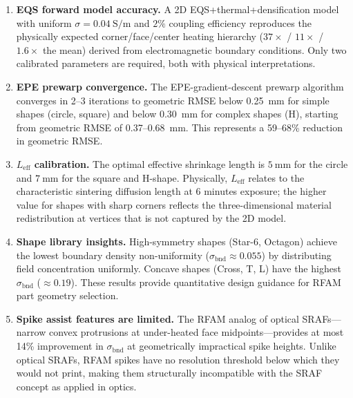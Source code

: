 \documentclass[10pt,twocolumn]{article}
\newcommand{\bndstd}{\sigma_{\mathrm{bnd}}}
\newcommand{\Leff}{L_{\mathrm{eff}}}
\begin{document}
\begin{enumerate}

\item \textbf{EQS forward model accuracy.}  A 2D EQS+thermal+densification
      model with uniform $\sigma = \SI{0.04}{\siemens\per\meter}$ and
      $2\%$ coupling efficiency reproduces the physically expected
      corner/face/center heating hierarchy ($37\times$ / $11\times$ /
      $1.6\times$ the mean) derived from electromagnetic boundary
      conditions.  Only two calibrated parameters are required, both
      with physical interpretations.

\item \textbf{EPE prewarp convergence.}  The EPE-gradient-descent
      prewarp algorithm converges in 2--3 iterations to geometric RMSE
      below \SI{0.25}{\milli\meter} for simple shapes (circle, square)
      and below \SI{0.30}{\milli\meter} for complex shapes (H), starting
      from geometric RMSE of 0.37--\SI{0.68}{\milli\meter}.  This
      represents a 59--68\% reduction in geometric RMSE.

\item \textbf{$\Leff$ calibration.}  The optimal effective shrinkage
      length is $\SI{5}{\milli\meter}$ for the circle and
      $\SI{7}{\milli\meter}$ for the square and H-shape.  Physically,
      $\Leff$ relates to the characteristic sintering diffusion length
      at 6 minutes exposure; the higher value for shapes with sharp
      corners reflects the three-dimensional material redistribution
      at vertices that is not captured by the 2D model.

\item \textbf{Shape library insights.}  High-symmetry shapes (Star-6,
      Octagon) achieve the lowest boundary density non-uniformity
      ($\bndstd \approx 0.055$) by distributing field concentration
      uniformly.  Concave shapes (Cross, T, L) have the highest
      $\bndstd$ ($\approx 0.19$).  These results provide quantitative
      design guidance for RFAM part geometry selection.

\item \textbf{Spike assist features are limited.}  The RFAM analog of
      optical SRAFs---narrow convex protrusions at under-heated face
      midpoints---provides at most 14\% improvement in $\bndstd$ at
      geometrically impractical spike heights.  Unlike optical SRAFs,
      RFAM spikes have no resolution threshold below which they would
      not print, making them structurally incompatible with the SRAF
      concept as applied in optics.


\end{enumerate}
\end{document}
